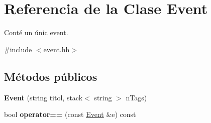 \hypertarget{class_event}{}\section{Referencia de la Clase Event}
\label{class_event}


Conté un únic event.  




{\ttfamily \#include $<$event.\+hh$>$}

\subsection*{Métodos públicos}
\begin{DoxyCompactItemize}
\item 
\hypertarget{class_event_abf070291c8f16b4fb208ff747461c4ec}{}{\bfseries Event} (string titol, stack$<$ string $>$ n\+Tags)\label{class_event_abf070291c8f16b4fb208ff747461c4ec}

\item 
\hypertarget{class_event_aee1b4c7b6d48a5411a12447e2b207f93}{}bool {\bfseries operator==} (const \hyperlink{class_event}{Event} \&e) const \label{class_event_aee1b4c7b6d48a5411a12447e2b207f93}


\end{DoxyCompactItemize}
